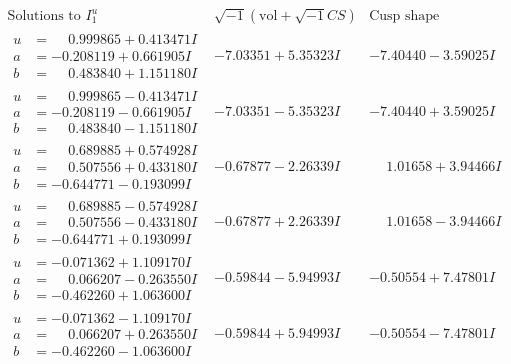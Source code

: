 \documentclass[1p]{elsarticle_modified}
\theoremstyle{definition}
\newcommand{\I}{\sqrt{-1}}
\begin{document}
$$\begin{array}{c|c|c}  
\text{Solutions to }I^u_{1}& \I (\text{vol} + \sqrt{-1}CS) & \text{Cusp shape}\\
 \hline 
\begin{aligned}
u &= \phantom{-}0.999865 + 0.413471 I \\
a &= -0.208119 + 0.661905 I \\
b &= \phantom{-}0.483840 + 1.151180 I\end{aligned}
 & -7.03351 + 5.35323 I & -7.40440 - 3.59025 I \\ \hline\begin{aligned}
u &= \phantom{-}0.999865 - 0.413471 I \\
a &= -0.208119 - 0.661905 I \\
b &= \phantom{-}0.483840 - 1.151180 I\end{aligned}
 & -7.03351 - 5.35323 I & -7.40440 + 3.59025 I \\ \hline\begin{aligned}
u &= \phantom{-}0.689885 + 0.574928 I \\
a &= \phantom{-}0.507556 + 0.433180 I \\
b &= -0.644771 - 0.193099 I\end{aligned}
 & -0.67877 - 2.26339 I & \phantom{-}1.01658 + 3.94466 I \\ \hline\begin{aligned}
u &= \phantom{-}0.689885 - 0.574928 I \\
a &= \phantom{-}0.507556 - 0.433180 I \\
b &= -0.644771 + 0.193099 I\end{aligned}
 & -0.67877 + 2.26339 I & \phantom{-}1.01658 - 3.94466 I \\ \hline\begin{aligned}
u &= -0.071362 + 1.109170 I \\
a &= \phantom{-}0.066207 - 0.263550 I \\
b &= -0.462260 + 1.063600 I\end{aligned}
 & -0.59844 - 5.94993 I & -0.50554 + 7.47801 I \\ \hline\begin{aligned}
u &= -0.071362 - 1.109170 I \\
a &= \phantom{-}0.066207 + 0.263550 I \\
b &= -0.462260 - 1.063600 I\end{aligned}
 & -0.59844 + 5.94993 I & -0.50554 - 7.47801 I \\ \hline\begin{aligned}

\end{aligned}
\end{array}$$
\end{document}
